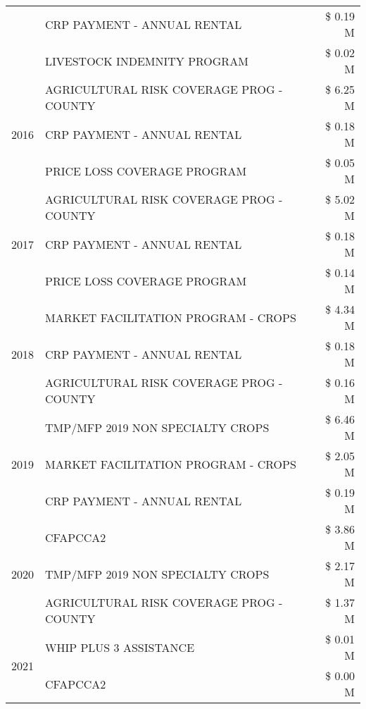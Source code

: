 \begin{tabular}{llr}
 & CRP PAYMENT - ANNUAL RENTAL & \$ 0.19 M \\
 & LIVESTOCK INDEMNITY PROGRAM & \$ 0.02 M \\
\cline{1-3}
\multirow[t]{3}{*}{2016} & AGRICULTURAL RISK COVERAGE PROG - COUNTY & \$ 6.25 M \\
 & CRP PAYMENT - ANNUAL RENTAL & \$ 0.18 M \\
 & PRICE LOSS COVERAGE PROGRAM & \$ 0.05 M \\
\cline{1-3}
\multirow[t]{3}{*}{2017} & AGRICULTURAL RISK COVERAGE PROG - COUNTY & \$ 5.02 M \\
 & CRP PAYMENT - ANNUAL RENTAL & \$ 0.18 M \\
 & PRICE LOSS COVERAGE PROGRAM & \$ 0.14 M \\
\cline{1-3}
\multirow[t]{3}{*}{2018} & MARKET FACILITATION PROGRAM - CROPS & \$ 4.34 M \\
 & CRP PAYMENT - ANNUAL RENTAL & \$ 0.18 M \\
 & AGRICULTURAL RISK COVERAGE PROG - COUNTY & \$ 0.16 M \\
\cline{1-3}
\multirow[t]{3}{*}{2019} & TMP/MFP 2019 NON SPECIALTY CROPS & \$ 6.46 M \\
 & MARKET FACILITATION PROGRAM - CROPS & \$ 2.05 M \\
 & CRP PAYMENT - ANNUAL RENTAL & \$ 0.19 M \\
\cline{1-3}
\multirow[t]{3}{*}{2020} & CFAPCCA2 & \$ 3.86 M \\
 & TMP/MFP 2019 NON SPECIALTY CROPS & \$ 2.17 M \\
 & AGRICULTURAL RISK COVERAGE PROG - COUNTY & \$ 1.37 M \\
\cline{1-3}
\multirow[t]{2}{*}{2021} & WHIP PLUS 3 ASSISTANCE & \$ 0.01 M \\
 & CFAPCCA2 & \$ 0.00 M \\
\cline{1-3}
\bottomrule
\end{tabular}

